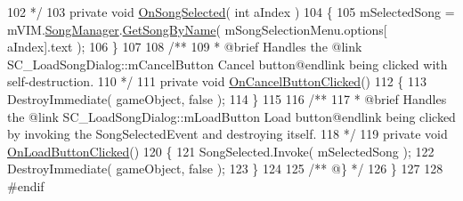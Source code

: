 \begin{DoxyCodeInclude}
102 \textcolor{comment}{    */}
103     \textcolor{keyword}{private} \textcolor{keywordtype}{void} \hyperlink{group___s_c___l_s_d_handlers_gacbe31698637339188fd50ba1a6723eab}{OnSongSelected}( \textcolor{keywordtype}{int} aIndex )
104     \{
105         mSelectedSong = mVIM.\hyperlink{group___v_i_m_pub_ga33dae94932c10c66db76a0eebec76b01}{SongManager}.\hyperlink{group___s_m_pub_func_gafe818c55bd858c52c95a2fa7a566006a}{GetSongByName}( mSongSelectionMenu.options[
      aIndex].text );
106     \}
107 \textcolor{comment}{}
108 \textcolor{comment}{    /**}
109 \textcolor{comment}{     * @brief Handles the @link SC\_LoadSongDialog::mCancelButton Cancel button@endlink being clicked with
       self-destruction.}
110 \textcolor{comment}{    */}
111     \textcolor{keyword}{private} \textcolor{keywordtype}{void} \hyperlink{group___s_c___l_s_d_handlers_gae393a24bbdd4fa1d2b45fa4199fb453a}{OnCancelButtonClicked}()
112     \{
113         DestroyImmediate( gameObject, \textcolor{keyword}{false} );
114     \}
115 \textcolor{comment}{}
116 \textcolor{comment}{    /**}
117 \textcolor{comment}{     * @brief Handles the @link SC\_LoadSongDialog::mLoadButton Load button@endlink being clicked by
       invoking the SongSelectedEvent and destroying itself.}
118 \textcolor{comment}{    */}
119     \textcolor{keyword}{private} \textcolor{keywordtype}{void} \hyperlink{group___s_c___l_s_d_handlers_gad6ab852f2ac019395482e8c836061639}{OnLoadButtonClicked}()
120     \{
121         SongSelected.Invoke( mSelectedSong );
122         DestroyImmediate( gameObject, \textcolor{keyword}{false} );
123     \}
124 \textcolor{comment}{}
125 \textcolor{comment}{    /** @\} */}
126 \}
127 
128 \textcolor{preprocessor}{#endif}
\end{DoxyCodeInclude}
 